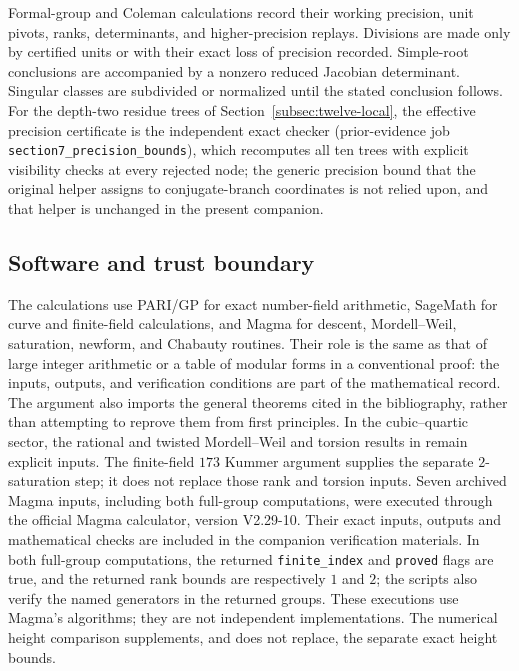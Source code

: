 \documentclass[11pt]{article}
\theoremstyle{definition}
\theoremstyle{remark}
\begin{document}
Formal-group and Coleman calculations record their working precision,
unit pivots, ranks, determinants, and higher-precision replays.  Divisions
are made only by certified units or with their exact loss of precision
recorded.  Simple-root conclusions are accompanied by a nonzero reduced
Jacobian determinant.  Singular classes are subdivided or normalized until
the stated conclusion follows.
For the depth-two residue trees of Section~\ref{subsec:twelve-local}, the
effective precision certificate is the independent exact checker
 (prior-evidence
job \texttt{section7\_precision\_bounds}), which recomputes all ten trees
with explicit visibility checks at every rejected node; the generic
precision bound that the original helper
 assigns to
conjugate-branch coordinates is not relied upon, and that helper is
unchanged in the present companion.

\subsection{Software and trust boundary}

The calculations use PARI/GP \cite{PARI} for exact number-field arithmetic,
SageMath \cite{Sage} for curve and finite-field calculations, and Magma
\cite{Magma} for descent,
Mordell--Weil, saturation, newform, and Chabauty routines.  Their role is
the same as that of large integer arithmetic or a table of modular forms in
a conventional proof: the inputs, outputs, and verification conditions are
part of the mathematical record.  The argument also imports the general
theorems cited in the bibliography, rather than attempting to reprove them
from first principles.  In the cubic--quartic sector, the rational and
twisted Mordell--Weil and torsion results in
\cite[Lemma~7.3]{DahmenSiksek} remain explicit inputs.
The finite-field $173$ Kummer argument supplies the separate
$2$-saturation step; it does not replace those rank and torsion inputs.
Seven archived Magma inputs, including both full-group computations,
were executed through the official Magma calculator, version V2.29-10.
Their exact inputs, outputs and mathematical checks are included in
the companion verification materials.  In both full-group computations,
the returned \texttt{finite\_index} and \texttt{proved} flags are true,
and the returned rank bounds are respectively $1$ and $2$; the scripts
also verify the named generators in the returned groups.  These executions use Magma's
algorithms; they are not independent implementations.  The numerical
height comparison supplements, and does not replace, the separate exact
height bounds.
\end{document}
